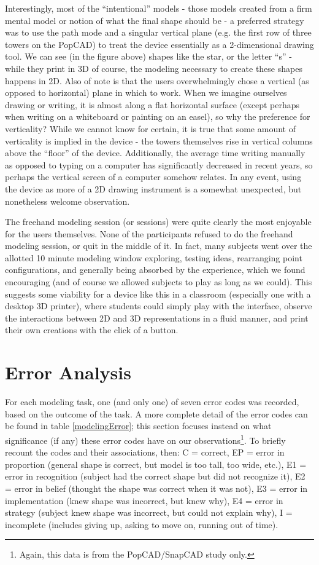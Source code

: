 Interestingly, most of the ``intentional'' models - those models created from a
firm mental model or notion of what the final shape should be - a preferred
strategy was to use the path mode and a singular vertical plane (e.g. the first
row of three towers on the PopCAD) to treat the device essentially as a
2-dimensional drawing tool. We can see (in the figure above) shapes like the
star, or the letter ``s'' - while they print in 3D of course, the modeling
necessary to create these shapes happens in 2D. Also of note is that the users
overwhelmingly chose a vertical (as opposed to horizontal) plane in which to
work. When we imagine ourselves drawing or writing, it is almost along a flat
horizontal surface (except perhaps when writing on a whiteboard or painting on
an easel), so why the preference for verticality? While we cannot know for
certain, it is true that some amount of verticality is implied in the device -
the towers themselves rise in vertical columns above the ``floor'' of the
device. Additionally, the average time writing manually as opposed to typing on
a computer has significantly decreased in recent years, so perhaps the vertical
screen of a computer somehow relates. In any event, using the device as more of
a 2D drawing instrument is a somewhat unexpected, but nonetheless welcome
observation.

The freehand modeling session (or sessions) were quite clearly the most
enjoyable for the users themselves. None of the participants refused to do the
freehand modeling session, or quit in the middle of it. In fact, many subjects
went over the allotted 10 minute modeling window exploring, testing ideas,
rearranging point configurations, and generally being absorbed by the
experience, which we found encouraging (and of course we allowed subjects to
play as long as we could). This suggests some viability for a device like this
in a classroom (especially one with a desktop 3D printer), where students could
simply play with the interface, observe the interactions between 2D and 3D
representations in a fluid manner, and print their own creations with the click
of a button.


\section{Error Analysis}

For each modeling task, one (and only one) of seven error codes was recorded,
based on the outcome of the task. A more complete detail of the error codes can be
found in table \ref{modelingError}; this section focuses instead on what significance
(if any) these error codes have on our observations\footnote{Again, this data
is from the PopCAD/SnapCAD study only.}. To briefly recount the codes and their
associations, then: C = correct, EP = error in proportion (general shape is
correct, but model is too tall, too wide, etc.), E1 = error in recognition
(subject had the correct shape but did not recognize it), E2 = error in belief
(thought the shape was correct when it was not), E3 = error in implementation
(knew shape was incorrect, but knew why), E4 = error in strategy (subject knew
shape was incorrect, but could not explain why), I = incomplete (includes
giving up, asking to move on, running out of time).

